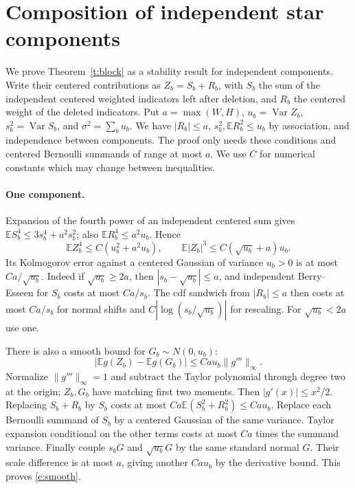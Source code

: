 \documentclass[11pt]{article}
\newcommand{\E}{\mathbb E}
\newcommand{\Var}{\operatorname{Var}}
\numberwithin{equation}{section}
\begin{document}
\section{Composition of independent star components}\label{sec:blocks}
We prove Theorem~\ref{t:block} as a stability result for independent components.
Write their centered contributions as $Z_b=S_b+R_b$, with $S_b$ the sum of the
independent centered weighted indicators left after deletion, and $R_b$ the
centered weight of the deleted indicators. Put $a=\max(W,H)$, $u_b=\Var Z_b$,
$s_b^2=\Var S_b$, and $\sigma^2=\sum_b u_b$. We have $|R_b|\le a$,
$s_b^2,\E R_b^2\le u_b$ by association, and independence between components.
The proof only needs these conditions and centered Bernoulli summands of range at most $a$.
We use $C$ for numerical constants which may change between inequalities.

\paragraph{One component.}
Expansion of the fourth power of an independent centered sum gives
$\E S_b^4\le3s_b^4+a^2s_b^2$; also $\E R_b^4\le a^2u_b$. Hence
\begin{equation}\label{e:moments}
 \E Z_b^4\le C(u_b^2+a^2u_b),\qquad \E|Z_b|^3\le C(\sqrt{u_b}+a)u_b .
\end{equation}
Its Kolmogorov error against a centered Gaussian of variance $u_b>0$ is at most
$Ca/\sqrt{u_b}$. Indeed if $\sqrt{u_b}\ge2a$, then
$|s_b-\sqrt{u_b}|\le a$, and independent Berry--Esseen for $S_b$ costs at most
$Ca/s_b$. The cdf sandwich from $|R_b|\le a$ then costs at most
$Ca/s_b$ for normal shifts and $C|\log(s_b/\sqrt{u_b})|$ for rescaling.
For $\sqrt{u_b}<2a$ use one.

There is also a smooth bound for $G_b\sim N(0,u_b)$:
\begin{equation}\label{e:smooth}
 |\E g(Z_b)-\E g(G_b)|\le Ca u_b\|g'''\|_\infty .
\end{equation}
Normalize $\|g'''\|_\infty=1$ and subtract the Taylor polynomial through degree two
at the origin; $Z_b,G_b$ have matching first two moments. Then $|g'(x)|\le x^2/2$.
Replacing $S_b+R_b$ by $S_b$ costs at most $Ca\E(S_b^2+R_b^2)\le Ca u_b$.
Replace each Bernoulli summand of $S_b$ by a centered Gaussian of the same variance.
Taylor expansion conditional on the other terms costs at most $Ca$ times the
summand variance. Finally couple $s_bG$ and $\sqrt{u_b}G$ by the same standard
normal $G$. Their scale difference is at most $a$, giving another $Ca u_b$ by the
derivative bound. This proves \eqref{e:smooth}.
\end{document}
